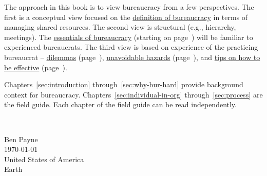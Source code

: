 
The approach in this book is to view bureaucracy from a few perspectives. The first is a conceptual view focused on the \hyperref[sec:define-bureaucracy]{definition of bureaucracy} in terms of managing shared resources. The second view is structural (e.g., hierarchy, meetings). The \hyperref[sec:fundamentals-of-b]{essentials of bureaucracy} (starting on page~\pageref{sec:fundamentals-of-b})
will be familiar to experienced bureaucrats. 
The third view is based on experience of the practicing bureaucrat -- \hyperref[sec:dilemma-trilemma]{dilemmas} (page~\pageref{sec:dilemma-trilemma}), \hyperref[sec:unavoidable-hazards]{unavoidable hazards} (page~\pageref{sec:unavoidable-hazards}), and \hyperref[sec:effective-bureaucrat]{tips on how to be effective} (page~\pageref{sec:effective-bureaucrat}). 



Chapters~\ref{sec:introduction} through~\ref{sec:why-bur-hard} provide background context for bureaucracy. 
Chapters~\ref{sec:individual-in-org} through~\ref{sec:process} are the field guide. 
Each chapter of the field guide can be read independently. 



\ \\

\begin{flushright}
Ben Payne\\
\today\\
United States of America\\
Earth
\end{flushright}


